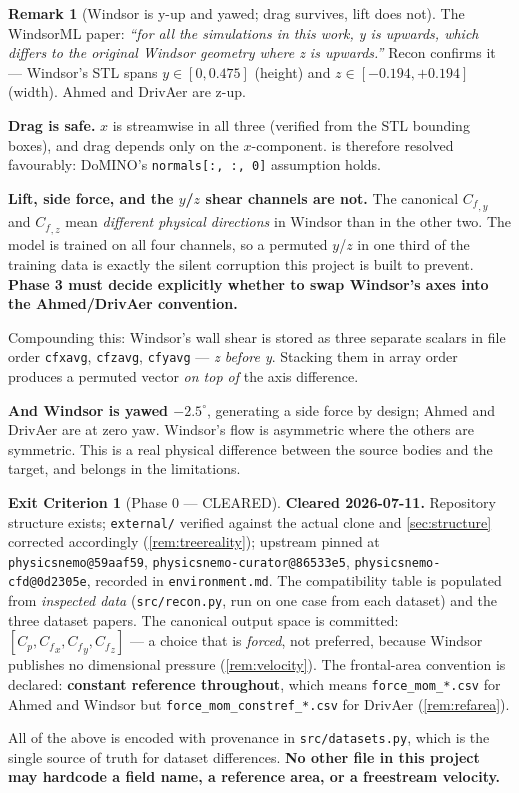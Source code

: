 \documentclass[10pt,a4paper]{article}
\theoremstyle{definition}
\newtheorem{criterion}{Exit Criterion}[section]
\newtheorem{remark}{Remark}[section]
\newcommand{\Cp}{{C_p}}
\newcommand{\Cf}{{C_f}}
\begin{document}
\begin{remark}[Windsor is y-up and yawed; drag survives, lift does not]
\label{rem:windsoraxes}
The WindsorML paper: \emph{``for all the simulations in this work, y is upwards, which
differs to the original Windsor geometry where z is upwards.''} Recon confirms it ---
Windsor's STL spans $y \in [0, 0.475]$ (height) and $z \in [-0.194, +0.194]$ (width).
Ahmed and DrivAer are z-up.

\textbf{Drag is safe.} $x$ is streamwise in all three (verified from the STL bounding
boxes), and drag depends only on the $x$-component.  is therefore
resolved favourably: DoMINO's \texttt{normals[:, :, 0]} assumption holds.

\textbf{Lift, side force, and the $y$/$z$ shear channels are not.} The canonical
$\Cf_{,y}$ and $\Cf_{,z}$ mean \emph{different physical directions} in Windsor than in
the other two. The model is trained on all four channels, so a permuted $y$/$z$ in one
third of the training data is exactly the silent corruption this project is built to
prevent. \textbf{Phase 3 must decide explicitly whether to swap Windsor's axes into the
Ahmed/DrivAer convention.}

Compounding this: Windsor's wall shear is stored as three separate scalars in file order
\texttt{cfxavg}, \texttt{cfzavg}, \texttt{cfyavg} --- \emph{z before y}. Stacking them in
array order produces a permuted vector \emph{on top of} the axis difference.

\textbf{And Windsor is yawed $-2.5^\circ$}, generating a side force by design; Ahmed and
DrivAer are at zero yaw. Windsor's flow is asymmetric where the others are symmetric.
This is a real physical difference between the source bodies and the target, and belongs
in the limitations.
\end{remark}

\begin{criterion}[Phase 0 --- CLEARED]
\label{crit:p0}
\textbf{Cleared 2026-07-11.} Repository structure exists; \texttt{external/} verified
against the actual clone and \cref{sec:structure} corrected accordingly
(\cref{rem:treereality}); upstream pinned at \texttt{physicsnemo@59aaf59},
\texttt{physicsnemo-curator@86533e5}, \texttt{physicsnemo-cfd@0d2305e}, recorded in
\texttt{environment.md}. The compatibility table is populated from \emph{inspected data}
(\texttt{src/recon.py}, run on one case from each dataset) and the three dataset papers.
The canonical output space is committed: $[\Cp, \Cf_x, \Cf_y, \Cf_z]$ --- a choice that
is \emph{forced}, not preferred, because Windsor publishes no dimensional pressure
(\cref{rem:velocity}). The frontal-area convention is declared: \textbf{constant
reference throughout}, which means \texttt{force\_mom\_*.csv} for Ahmed and Windsor but
\texttt{force\_mom\_constref\_*.csv} for DrivAer (\cref{rem:refarea}).

All of the above is encoded with provenance in \texttt{src/datasets.py}, which is the
single source of truth for dataset differences. \textbf{No other file in this project may
hardcode a field name, a reference area, or a freestream velocity.}
\end{criterion}
\end{document}
